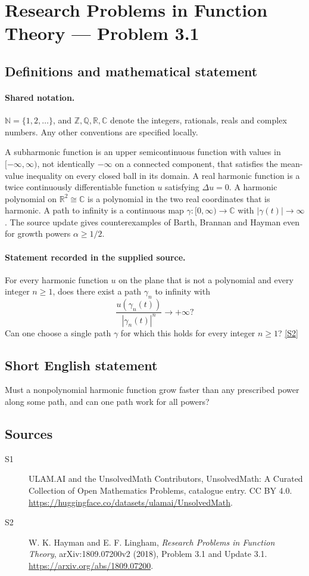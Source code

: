 \documentclass[11pt]{article}
\newcommand{\sref}[2]{\hyperlink{source:#1:#2}{[S#2]}}
\begin{document}
\section{Research Problems in Function Theory — Problem 3.1}\label{statement}

\subsection{Definitions and mathematical statement}

\paragraph{Shared notation.}$\mathbb N=\{1,2,\ldots\}$, and $\mathbb Z,\mathbb Q,\mathbb R,\mathbb C$ denote the integers, rationals, reals and complex numbers. Any other conventions are specified locally.


A subharmonic function is an upper semicontinuous function with values in $[-\infty,\infty)$, not identically $-\infty$ on a connected component, that satisfies the mean-value inequality on every closed ball in its domain. A real harmonic function is a twice continuously differentiable function $u$ satisfying $\Delta u=0$. A harmonic polynomial on $\mathbb R^2\cong\mathbb C$ is a polynomial in the two real coordinates that is harmonic. A path to infinity is a continuous map $\gamma:[0,\infty)\to\mathbb C$ with $|\gamma(t)|\to\infty$.
The source update gives counterexamples of Barth, Brannan and Hayman even for growth powers $\alpha\geq1/2$.
\paragraph{Statement recorded in the supplied source.}
For every harmonic function $u$ on the plane that is not a polynomial and every integer $n\geq1$, does there exist a path $\gamma_n$ to infinity with
\[\frac{u(\gamma_n(t))}{|\gamma_n(t)|^n}\longrightarrow+\infty?\]
Can one choose a single path $\gamma$ for which this holds for every integer $n\geq1$? \sref{statement}{2}
\subsection{Short English statement}
Must a nonpolynomial harmonic function grow faster than any prescribed power along some path, and can one path work for all powers?
\subsection{Sources}
\begin{description}
\item[\hypertarget{source:statement:1}{S1}] ULAM.AI and the UnsolvedMath Contributors, UnsolvedMath: A Curated Collection of Open Mathematics Problems, catalogue entry. CC BY 4.0. \url{https://huggingface.co/datasets/ulamai/UnsolvedMath}.
\item[\hypertarget{source:statement:2}{S2}] W. K. Hayman and E. F. Lingham, \emph{Research Problems in Function Theory}, arXiv:1809.07200v2 (2018), Problem 3.1 and Update 3.1. \url{https://arxiv.org/abs/1809.07200}.
\end{description}
\label{end:statement}
\end{document}
